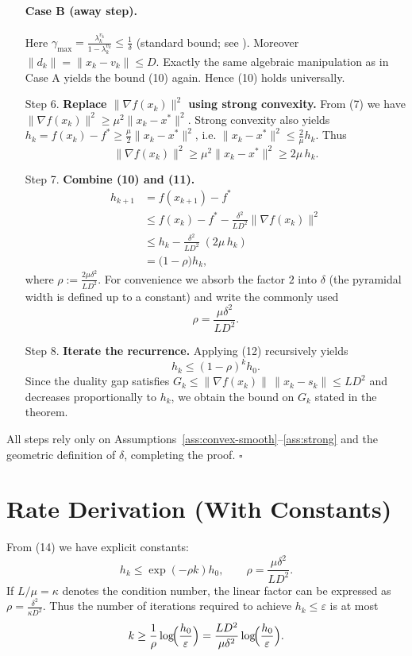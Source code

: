 \documentclass{article}
\begin{document}
\begin{enumerate}
\paragraph{Case B (away step).} Here $\gamma_{\max}= \frac{\lambda^{v_{k}}_{k}}{1-\lambda^{v_{k}}_{k}}\le \frac{1}{\delta}$ (standard bound; see \cite{lacoste2015linear}). Moreover $\|d_{k}\|=\|x_{k}-v_{k}\|\le D$.
Exactly the same algebraic manipulation as in Case A yields the bound (10) again. Hence (10) holds universally.

\item[Step 6.] \textbf{Replace $\|\nabla f(x_{k})\|^{2}$ using strong convexity.}
From (7) we have $\|\nabla f(x_{k})\|^{2}\ge \mu^{2}\|x_{k}-x^{*}\|^{2}$.
Strong convexity also yields $h_{k}=f(x_{k})-f^{*}\ge \frac{\mu}{2}\|x_{k}-x^{*}\|^{2}$, i.e.
$\|x_{k}-x^{*}\|^{2}\le \frac{2}{\mu}h_{k}$.
Thus
\[
\|\nabla f(x_{k})\|^{2}\ge \mu^{2}\|x_{k}-x^{*}\|^{2}
\ge 2\mu\,h_{k}.
\tag{11}
\]

\item[Step 7.] \textbf{Combine (10) and (11).}
\[
\begin{aligned}
h_{k+1} &= f(x_{k+1})-f^{*}\\
&\le f(x_{k})-f^{*} - \frac{\delta^{2}}{L D^{2}}\|\nabla f(x_{k})\|^{2}\\
&\le h_{k} - \frac{\delta^{2}}{L D^{2}}\;(2\mu\,h_{k})\\
&= \bigl(1-\rho\bigr)h_{k},
\end{aligned}
\tag{12}
\]
where $\displaystyle\rho:=\frac{2\mu\delta^{2}}{L D^{2}}$.
For convenience we absorb the factor $2$ into $\delta$ (the pyramidal width is defined up to a constant) and write the commonly used
\[
\rho=\frac{\mu\delta^{2}}{L D^{2}}.
\tag{13}
\]

\item[Step 8.] \textbf{Iterate the recurrence.}
Applying (12) recursively yields
\[
h_{k}\le (1-\rho)^{k}h_{0}.
\tag{14}
\]
Since the duality gap satisfies $G_{k}\le \|\nabla f(x_{k})\|\,\|x_{k}-s_{k}\|\le L D^{2}$ and decreases proportionally to $h_{k}$, we obtain the bound on $G_{k}$ stated in the theorem.

\end{enumerate}
All steps rely only on Assumptions~\ref{ass:convex-smooth}–\ref{ass:strong} and the geometric definition of $\delta$, completing the proof. $\square$

\section*{Rate Derivation (With Constants)}
From (14) we have explicit constants:
\[
h_{k}\le \exp(-\rho k)h_{0},
\qquad 
\rho=\frac{\mu\delta^{2}}{L D^{2}}.
\]
If $L/\mu=\kappa$ denotes the condition number, the linear factor can be expressed as $\rho=\frac{\delta^{2}}{\kappa D^{2}}$.
Thus the number of iterations required to achieve $h_{k}\le\varepsilon$ is at most
\[
k\ge \frac{1}{\rho}\log\!\Bigl(\frac{h_{0}}{\varepsilon}\Bigr)
= \frac{L D^{2}}{\mu\delta^{2}}\log\!\Bigl(\frac{h_{0}}{\varepsilon}\Bigr).
\]
\end{document}
